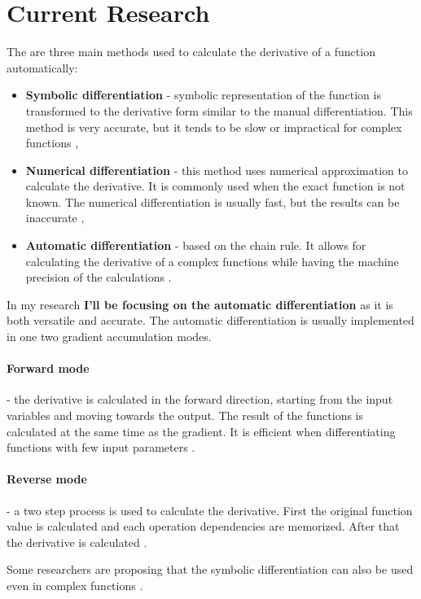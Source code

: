 \documentclass[conference,a4paper]{IEEEtran}
\begin{document}
\section{Current Research}
The are three main methods used to calculate the derivative of a function automatically:
\begin{itemize}
    \item \textbf{Symbolic differentiation} - symbolic representation of the function is transformed to the derivative form similar to the manual differentiation. This method is very accurate, but it tends to be slow or impractical for complex functions \cite{durrbaum2002comparison},
    \item \textbf{Numerical differentiation} - this method uses numerical approximation to calculate the derivative. It is commonly used when the exact function is not known. The numerical differentiation is usually fast, but the results can be inaccurate \cite{cullum1971numerical},
    \item \textbf{Automatic differentiation} - based on the chain rule. It allows for calculating the derivative of a complex functions while having the machine precision of the calculations \cite{baydin2018automatic}.
\end{itemize}

In my research \textbf{I'll be focusing on the automatic differentiation} as it is both versatile and accurate.
The automatic differentiation is usually implemented in one two gradient accumulation modes.
\paragraph{Forward mode} - the derivative is calculated in the forward direction, starting from the input variables and moving towards the output. The result of the functions is calculated at the same time as the gradient. It is efficient when differentiating functions with few input parameters \cite{revels2016forward}.
\paragraph{Reverse mode} - a two step process is used to calculate the derivative. First the original function value is calculated and each operation dependencies are memorized. After that the derivative is calculated \cite{baydin2018automatic}.

Some researchers are proposing that the symbolic differentiation can also be used even in complex functions \cite{laue2019equivalence}.
\end{document}
